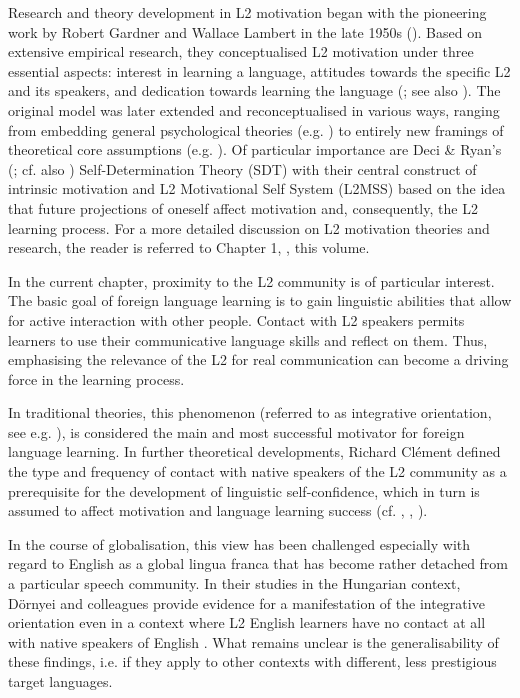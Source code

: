 \documentclass[output=paper]{langsci/langscibook}
\begin{document}
Research and theory development in L2 motivation began with the pioneering work by Robert Gardner and Wallace Lambert in the late 1950s (\citealt{GardnerLambert1959}). Based on extensive empirical research, they conceptualised L2 motivation under three essential aspects: interest in learning a language, attitudes towards the specific L2 and its speakers, and dedication towards learning the language (\citealt{GardnerLambert1959}; see also \citealt{Gardner1985}). The original model was later extended and reconceptualised in various ways, ranging from embedding general psychological theories (e.g. \citealt{Noels2001}) to entirely new framings of theoretical core assumptions (e.g. \citealt{Doernyei2005}). Of particular importance are Deci \& Ryan’s (\citeyear{DeciRyan1985}; cf. also \citealt{RyanDeci2002}) Self-Determination Theory (SDT) with their central construct of intrinsic motivation and  L2 Motivational Self System (L2MSS) based on the idea that future projections of oneself affect motivation and, consequently, the L2 learning process. For a more detailed discussion on L2 motivation theories and research, the reader is referred to Chapter 1, , this volume.

In the current chapter, proximity to the L2 community is of particular interest. The basic goal of foreign language learning is to gain linguistic abilities that allow for active interaction with other people. Contact with L2 speakers permits learners to use their communicative language skills and reflect on them. Thus, emphasising the relevance of the L2 for real communication can become a driving force in the learning process.

In traditional theories, this phenomenon (referred to as integrative orientation, see e.g. \citealt{Gardner1985}), is considered the main and most successful motivator for foreign language learning. In further theoretical developments, Richard Clément defined the type and frequency of contact with native speakers of the L2 community as a prerequisite for the development of linguistic self-confidence, which in turn is assumed to affect motivation and language learning success (cf. \citealt{Clement1980}, \citealt{ClementKruidenier1985}, \citealt{SampasivamClement2014}). 

In the course of globalisation, this view has been challenged especially with regard to English as a global lingua franca that has become rather detached from a particular speech community. In their studies in the Hungarian context, Dörnyei and colleagues provide evidence for a manifestation of the integrative orientation even in a context where L2 English learners have no contact at all with native speakers of English \citep{DoernyeiEtAl2006}. What remains unclear is the generalisability of these findings, i.e. if they apply to other contexts with different, less prestigious target languages.
\end{document}
